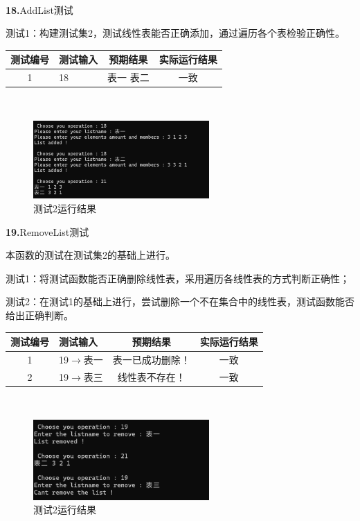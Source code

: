 \documentclass[supercite]{Experimental_Report}
\theoremstyle{definition}
\begin{document}
~\

\noindent\textbf{18.}AddList测试

测试1：构建测试集2，测试线性表能否正确添加，通过遍历各个表检验正确性。

\vspace{0.5em}

\begin{tabular}{|c|p{2.7cm}|c|c|}
	\hline
	测试编号 & 测试输入 & 预期结果 & 实际运行结果 \\
	\hline
	1 & 18 & 表一 表二 & 一致 \\
	\hline
\end{tabular}

~\

 \begin{figure}[H]
 	\centering
 	\includegraphics[width=0.6\textwidth]{images/线性表测试18.png}
 	\caption{测试2运行结果}
 	\label{txlab}
 \end{figure}

\noindent\textbf{19.}RemoveList测试

本函数的测试在测试集2的基础上进行。

测试1：将测试函数能否正确删除线性表，采用遍历各线性表的方式判断正确性；

测试2：在测试1的基础上进行，尝试删除一个不在集合中的线性表，测试函数能否给出正确判断。

\vspace{0.5em}

\begin{tabular}{|c|p{2.7cm}|c|c|}
	\hline
	测试编号 & 测试输入 & 预期结果 & 实际运行结果 \\
	\hline
	1 & 19$\rightarrow$表一 & 表一已成功删除！ & 一致 \\
	\hline
	2 & 19$\rightarrow$表三 & 线性表不存在！ & 一致 \\
	\hline
\end{tabular}

~\

 \begin{figure}[H]
 	\centering
 	\includegraphics[width=0.6\textwidth]{images/线性表测试19.png}
 	\caption{测试2运行结果}
 	\label{txlab}
 \end{figure}
\end{document}
